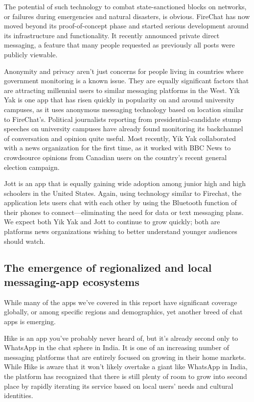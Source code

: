 \documentclass[notoc, symmetric, nobib, nols]{towcenter-guideto-book}
\begin{document}
The potential of such technology to combat state-sanctioned blocks on networks, or failures during emergencies and natural disasters, is obvious. FireChat has now moved beyond its proof-of-concept phase and started serious development around its infrastructure and functionality. It recently announced private direct messaging, a feature that many people requested as previously all posts were publicly viewable. 

Anonymity and privacy aren't just concerns for people living in countries where government monitoring is a known issue. They are equally significant factors that are attracting millennial users to similar messaging platforms in the West. Yik Yak is one app that has risen quickly in popularity on and around university campuses, as it uses anonymous messaging technology based on location similar to FireChat's. Political journalists reporting from presidential-candidate stump speeches on university campuses have already found monitoring its backchannel of conversation and opinion quite useful. Most recently, Yik Yak collaborated with a news organization for the first time, as it worked with BBC News to crowdsource opinions from Canadian users on the country's recent general election campaign.\autocite{BBCYikYak}

Jott is an app that is equally gaining wide adoption among junior high and high schoolers in the United States. Again, using technology similar to Firechat, the application lets users chat with each other by using the Bluetooth function of their phones to connect---eliminating the need for data or text messaging plans. We expect both Yik Yak and Jott to continue to grow quickly; both are platforms news organizations wishing to better understand younger audiences should watch.

\subsection{The emergence of regionalized and local messaging-app ecosystems}
While many of the apps we've covered in this report have significant coverage globally, or among specific regions and demographics, yet another breed of chat apps is emerging.

Hike is an app you've probably never heard of, but it's already second only to WhatsApp in the chat sphere in India. It is one of an increasing number of messaging platforms that are entirely focused on growing in their home markets. While Hike is aware that it won't likely overtake a giant like WhatsApp in India, the platform has recognized that there is still plenty of room to grow into second place by rapidly iterating its service based on local users' needs and cultural identities. 
\end{document}
